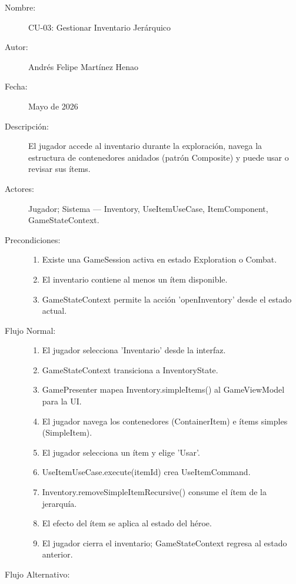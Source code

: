 \documentclass[stu,12pt,floatsintext]{apa7}
\begin{document}
\begin{description}
    \item[Nombre:] CU-03: Gestionar Inventario Jerárquico
    \item[Autor:] Andrés Felipe Martínez Henao
    \item[Fecha:] Mayo de 2026
    \item[Descripción:] El jugador accede al inventario durante la exploración, navega la estructura de contenedores anidados (patrón Composite) y puede usar o revisar sus ítems.
    \item[Actores:] Jugador; Sistema — Inventory, UseItemUseCase, ItemComponent, GameStateContext.
    \item[Precondiciones:] \hfill
        \begin{enumerate}[label=\arabic*.]
            \item Existe una GameSession activa en estado Exploration o Combat.
            \item El inventario contiene al menos un ítem disponible.
            \item GameStateContext permite la acción 'openInventory' desde el estado actual.
        \end{enumerate}
    \item[Flujo Normal:] \hfill
        \begin{enumerate}[label=\arabic*.]
            \item El jugador selecciona 'Inventario' desde la interfaz.
            \item GameStateContext transiciona a InventoryState.
            \item GamePresenter mapea Inventory.simpleItems() al GameViewModel para la UI.
            \item El jugador navega los contenedores (ContainerItem) e ítems simples (SimpleItem).
            \item El jugador selecciona un ítem y elige 'Usar'.
            \item UseItemUseCase.execute(itemId) crea UseItemCommand.
            \item Inventory.removeSimpleItemRecursive() consume el ítem de la jerarquía.
            \item El efecto del ítem se aplica al estado del héroe.
            \item El jugador cierra el inventario; GameStateContext regresa al estado anterior.
        \end{enumerate}
    \item[Flujo Alternativo:] \hfill

\end{description}
\end{document}
